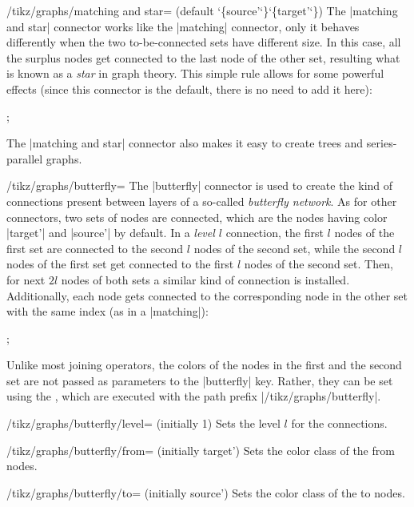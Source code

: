 \begin{key}{/tikz/graphs/matching and star= (default \char`\{source'\char`\}\char`\{target'\char`\})}
  The |matching and star| connector works like the |matching|
  connector, only it behaves differently when the two to-be-connected
  sets have different size. In this case, all the surplus nodes get
  connected to the last node of the other set, resulting what is known
  as a \emph{star} in graph theory. This simple rule allows
  for some powerful effects (since this connector is the default,
  there is no need to add it here):
  \begin{codeexample}[]
\tikz {};    
  \end{codeexample}
  The |matching and star| connector also makes it easy to create trees and
  series-parallel graphs.
\end{key}

\begin{key}{/tikz/graphs/butterfly=}
  The |butterfly| connector is used to create the kind of connections
  present between layers of a so-called \emph{butterfly network}.
  As for other connectors, two sets of nodes are connected, which are
  the nodes having color |target'| and |source'| by default. In a
  \emph{level $l$} connection, the first $l$ nodes of the first set
  are connected to the second $l$ nodes of the second set, while the
  second $l$ nodes of the first set get connected to the first $l$
  nodes of the second set. Then, for next $2l$ nodes of both sets a
  similar kind of connection is installed. Additionally, each node
  gets connected to the corresponding node in the other set with the
  same index (as in a |matching|):
\begin{codeexample}[]
\tikz {};
\end{codeexample}
  Unlike most joining operators, the colors of the nodes in the first
  and the second set are not passed as parameters to the |butterfly|
  key. Rather, they can be set using the , which are
  executed with the path prefix |/tikz/graphs/butterfly|.
  \begin{key}{/tikz/graphs/butterfly/level= (initially 1)}
    Sets the level $l$ for the connections.
  \end{key}
  \begin{key}{/tikz/graphs/butterfly/from= (initially target')}
    Sets the color class of the from nodes.
  \end{key}
  \begin{key}{/tikz/graphs/butterfly/to= (initially source')}
    Sets the color class of the to nodes.
  \end{key}
\end{key}



